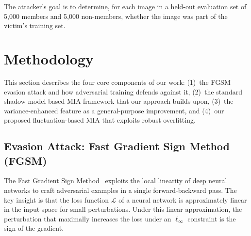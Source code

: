 \documentclass[conference]{IEEEtran}
\begin{document}
The attacker's goal is to determine, for each image in a held-out evaluation set of 5,000 members and 5,000 non-members, whether the image was part of the victim's training set.



\section{Methodology}
\label{sec:methodology}

This section describes the four core components of our work: (1)~the FGSM evasion attack and how adversarial training defends against it, (2)~the standard shadow-model-based MIA framework that our approach builds upon, (3)~the variance-enhanced feature as a general-purpose improvement, and (4)~our proposed fluctuation-based MIA that exploits robust overfitting.


\subsection{Evasion Attack: Fast Gradient Sign Method (FGSM)}
\label{sec:evasion_attack}

The Fast Gradient Sign Method~\cite{goodfellow2015explaining} exploits the local linearity of deep neural networks to craft adversarial examples in a single forward-backward pass. The key insight is that the loss function $\mathcal{L}$ of a neural network is approximately linear in the input space for small perturbations. Under this linear approximation, the perturbation that maximally increases the loss under an $\ell_\infty$ constraint is the sign of the gradient.
\end{document}
